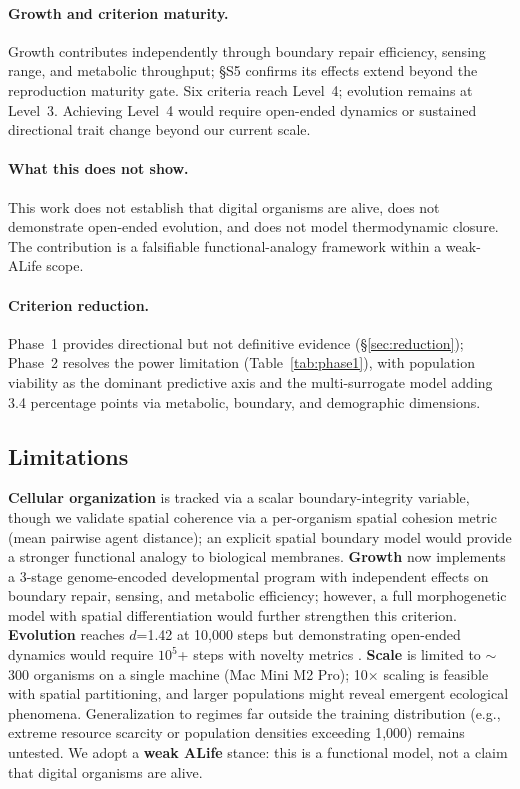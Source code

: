 \documentclass[letterpaper]{article}
\begin{document}
\paragraph{Growth and criterion maturity.}
Growth contributes independently through boundary repair efficiency, sensing
range, and metabolic throughput; §S5 confirms its effects extend beyond the
reproduction maturity gate.
Six criteria reach Level~4; evolution remains at Level~3. Achieving Level~4
would require open-ended dynamics or sustained directional trait change beyond
our current scale.

\paragraph{What this does not show.}
This work does not establish that digital organisms are alive, does not
demonstrate open-ended evolution, and does not model thermodynamic closure.
The contribution is a falsifiable functional-analogy framework within
a weak-ALife scope.

\paragraph{Criterion reduction.}
Phase~1 provides directional but not definitive evidence (§\ref{sec:reduction});
Phase~2 resolves the power limitation (Table~\ref{tab:phase1}), with
population viability as the dominant predictive axis and the multi-surrogate
model adding 3.4 percentage points via metabolic, boundary, and demographic
dimensions.


\subsection{Limitations}

\textbf{Cellular organization} is tracked via a scalar boundary-integrity
variable, though we validate spatial coherence via a per-organism
spatial cohesion metric (mean pairwise agent distance); an explicit
spatial boundary model would provide a stronger functional analogy to
biological membranes.
\textbf{Growth} now implements a 3-stage genome-encoded developmental
program with independent effects on boundary repair, sensing, and
metabolic efficiency; however, a full morphogenetic model with
spatial differentiation would further strengthen this criterion.
\textbf{Evolution} reaches $d$=1.42 at 10,000 steps but demonstrating
open-ended dynamics would require $10^5$+ steps with novelty metrics
\citep{bedau_2000_open}.
\textbf{Scale} is limited to $\sim$300 organisms on a single machine
(Mac Mini M2 Pro); 10$\times$ scaling is feasible with spatial partitioning,
and larger populations might reveal emergent ecological phenomena.
Generalization to regimes far outside the training distribution (e.g.,
extreme resource scarcity or population densities exceeding 1{,}000) remains
untested.
We adopt a \textbf{weak ALife} stance: this is a functional model, not
a claim that digital organisms are alive.
\end{document}
